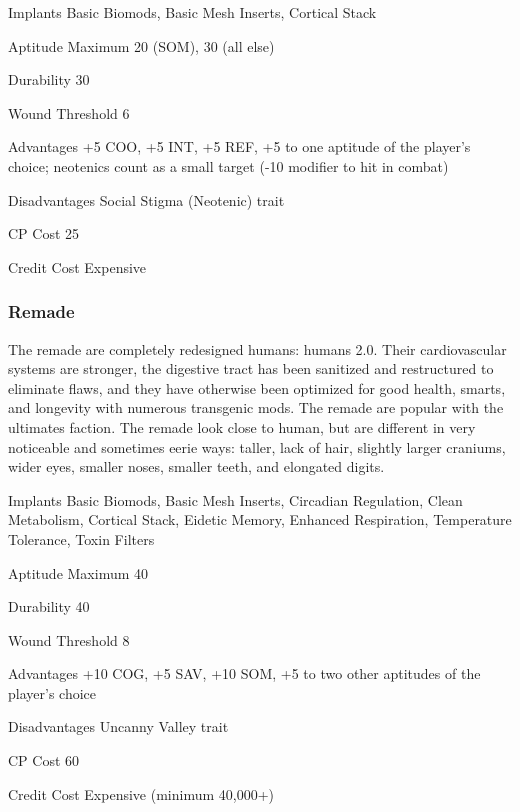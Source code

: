 \begin{description*}
\item[Implants] Basic Biomods, Basic Mesh Inserts, Cortical Stack 
\item[Aptitude Maximum] 20 (SOM), 30 (all else) 
\item[Durability] 30 
\item[Wound Threshold] 6 
\item[Advantages] +5 COO, +5 INT, +5 REF, +5 to one aptitude of the player’s choice; neotenics count as a small target (-10 modifier to hit in combat) 
\item[Disadvantages] Social Stigma (Neotenic) trait 
\item[CP Cost] 25 
\item[Credit Cost] Expensive 
\end{description*}

\subsubsection{Remade}
The remade are completely redesigned humans: humans 2.0. Their cardiovascular
systems are stronger, the digestive tract has been sanitized and restructured
to eliminate flaws, and they have otherwise been optimized for good health,
smarts, and longevity with numerous transgenic mods. The remade are popular
with the ultimates faction. The remade look close to human, but are different
in very noticeable and sometimes eerie ways: taller, lack of hair, slightly
larger craniums, wider eyes, smaller noses, smaller teeth, and elongated
digits.

\begin{description*}
\item[Implants] Basic Biomods, Basic Mesh Inserts, Circadian Regulation, Clean
  Metabolism, Cortical Stack, Eidetic Memory, Enhanced Respiration, Temperature
  Tolerance, Toxin Filters
\item[Aptitude Maximum] 40 
\item[Durability] 40 
\item[Wound Threshold] 8 
\item[Advantages] +10 COG, +5 SAV, +10 SOM, +5 to two other aptitudes of the
  player’s choice
\item[Disadvantages] Uncanny Valley trait 
\item[CP Cost] 60 
\item[Credit Cost] Expensive (minimum 40,000+) 
\end{description*}

